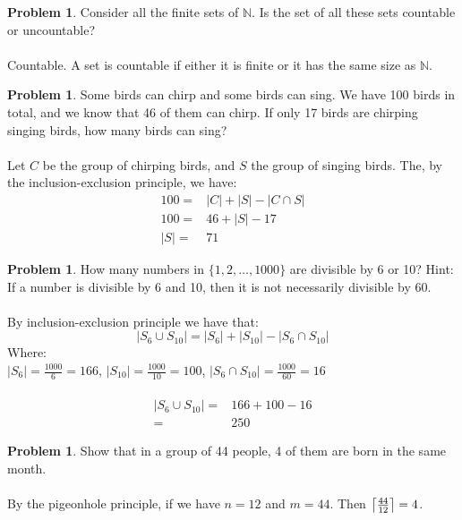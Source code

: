 \documentclass[10pt,leqno ]{article}
\DeclarePairedDelimiter{\ceil}{\lceil}{\rceil}
\theoremstyle{definition}
\newtheorem{problem}[theorem]{Problem}
\begin{document}
\newpage
\begin{problem} Consider all the finite sets of $\mathbb{N}$.  Is the set of all these sets countable or uncountable?
\\\\
\Large
Countable.  A set is countable if either it is finite or it has the same size as $\mathbb{N}$.
\end{problem}
\newpage

\begin{problem} Some birds can chirp and some birds can sing.  We have 100 birds in total, and  we  know  that  46  of  them  can  chirp.   If  only  17  birds  are  chirping singing birds, how many birds can sing?
\\\\
\Large
Let $C$ be the group of chirping birds, and $S$ the group of singing birds.  The, by the inclusion-exclusion principle, we have:\\
\begin{align*}
100 =& |C| + |S| - |C \cap S|\\
100 =& 46 + |S| - 17\\
  |S| =& 71
\end{align*}
\end{problem}
\newpage

\begin{problem} How many numbers in $\{1,2, \dots ,1000\}$ are divisible by 6 or 10?  Hint:  If a number is divisible by 6 and 10, then it is not necessarily divisible by 60.
\\\\
\Large
By inclusion-exclusion principle we have that:
$$|S_6 \cup S_{10}| = |S_6| + |S_{10}| - |S_6 \cap S_{10}|$$
Where:\\
$|S_6| = \frac{1000}{6} = 166$, $|S_{10}| = \frac{1000}{10} = 100$, $|S_6 \cap S_{10}| = \frac{1000}{60} = 16$
\\\\
\begin{align*}
|S_6 \cup S_{10}| =& 166 + 100 - 16\\
=& 250
\end{align*}
\end{problem}
\newpage

\begin{problem} Show that in a group of 44 people, 4 of them are born in the same month.
\\\\
\Large
By the pigeonhole principle, if we have $n=12$ and $m=44$.  Then $\ceil*{\frac{44}{12}} = 4$.
\end{problem}
\newpage
\end{document}
